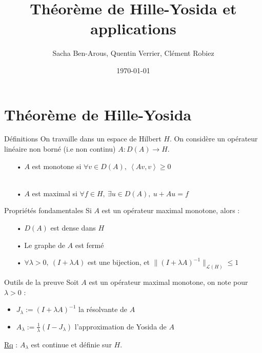 \documentclass[10pt]{beamer}
\title{Théorème de Hille-Yosida et applications}
\date{\today}
\author{Sacha Ben-Arous, Quentin Verrier, Clément Robiez}
\institute{ENS Paris-Saclay}
\begin{document}
  \maketitle
\begin{frame}
\tableofcontents
\end{frame}  


\section{Théorème de Hille-Yosida}
\begin{frame}{Définitions}
On travaille dans un espace de Hilbert $H$. On considère un opérateur linéaire non borné (i.e non continu) $A : D(A)\rightarrow H$.
\begin{itemize}
\item[•]  $A$ est monotone si $\forall v \in D(A), \ \left<Av,v\right> \geq 0$ \\ ~ \\
\item[•] $A$ est maximal si $\forall f\in H, \ \exists u\in D(A), \ u + Au=f$ 
\end{itemize}
\end{frame}


\begin{frame}{Propriétés fondamentales}
Si $A$ est un opérateur maximal monotone, alors :
\begin{itemize}
\item[•]  $D(A)$ est dense dans $H$ 
\item[•] Le graphe de $A$ est fermé 
\item[•] $\forall \lambda > 0, \ (I+\lambda A)$ est une bijection, et $\|(I+\lambda A)^{-1}\|_{\mathcal{L}(H)} \leq 1 $
\end{itemize}
\end{frame}


\begin{frame}{Outils de la preuve}
Soit $A$ est un opérateur maximal monotone, on note pour $\lambda > 0$ :
\begin{itemize}
\item<1->[•] $J_{\lambda} := (I+\lambda A)^{-1}$ la résolvante de $A$
\item<1->[•] $A_{\lambda} := \frac{1}{\lambda}(I-J_{\lambda})$ l'approximation de Yosida de $A$ 
\end{itemize}
\underline{Rq} : $A_{\lambda}$ est continue et définie sur $H$. \\ ~ \\
\end{frame}
\end{document}
